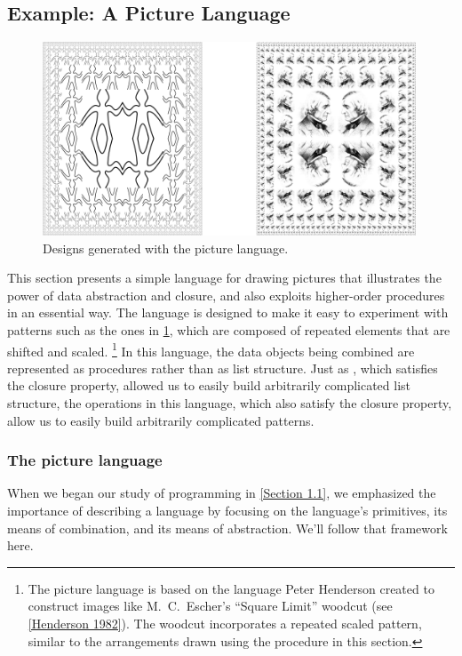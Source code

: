 \subsection{Example: A Picture Language}
\label{Section 2.2.4}

\begin{figure}[tb]
	\centering
	\includegraphics[width=111mm]{fig/chap2/Fig2.9-bigger.png}
	\caption{
		Designs generated with the picture language.
	}
	\label{Figure 2.9}
\end{figure}

This section presents a simple language for drawing pictures that illustrates the power of data abstraction and closure, and also exploits higher-order procedures in an essential way.
The language is designed to make it easy to experiment with patterns such as the ones in \cref{Figure 2.9}, which are composed of repeated elements that are shifted and scaled.%
\footnote{
	The picture language is based on the language Peter Henderson created to construct images like M.~C.~Escher’s “Square Limit” woodcut (see \cref{Henderson 1982}).
	The woodcut incorporates a repeated scaled pattern, similar to the arrangements drawn using the  procedure in this section.
}
In this language, the data objects being combined are represented as procedures rather than as list structure.
Just as , which satisfies the closure property, allowed us to easily build arbitrarily complicated list structure, the operations in this language, which also satisfy the closure property, allow us to easily build arbitrarily complicated patterns.



\subsubsection*{The picture language}

When we began our study of programming in \cref{Section 1.1}, we emphasized the importance of describing a language by focusing on the language’s primitives, its means of combination, and its means of abstraction.
We’ll follow that framework here.

